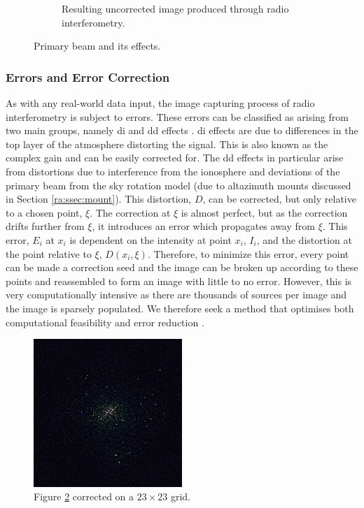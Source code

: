 \begin{figure}[H]
\begin{subfigure}{0.45\textwidth}
	\caption{Resulting uncorrected image produced through radio interferometry.}
	\label{ra:fig:uncorr}
  \end{subfigure}
  \caption{Primary beam and its effects.}
\end{figure}
%
\subsubsection{Errors and Error Correction}\label{ra:ssec:eec}
As with any real-world data input, the image capturing process of radio interferometry is subject to errors. These errors can be classified as arising from two main groups, namely \gls{di} and \gls{dd} effects \citep{smirnov2011revisiting}. \gls{di} effects are due to differences in the top layer of the atmosphere distorting the signal. This is also known as the complex gain and can be easily corrected for. The \gls{dd} effects in particular arise from distortions due to interference from the ionosphere and deviations of the primary beam from the sky rotation model (due to altazimuth mounts discussed in Section \ref{ra:ssec:mount}). This distortion, $D$, can be corrected, but only relative to a chosen point, $\xi$. The correction at $\xi$ is almost perfect, but as the correction drifts further from $\xi$, it introduces an error which propagates away from $\xi$. This error, $E_i$ at $x_i$ is dependent on the intensity at point $x_i$, $I_i$, and the distortion at the point relative to $\xi$, $D(x_i,\xi)$. Therefore, to minimize this error, every point can be made a correction seed and the image can be broken up according to these points and reassembled to form an image with little to no error. However, this is very computationally intensive as there are thousands of sources per image and the image is sparsely populated. We therefore seek a method that optimises both computational feasibility and error reduction \citep{smirnov2015radio}.
\begin{figure}[H]
	\centering
	\includegraphics[width=0.5\textwidth]{Images/corrected-23x23.png}
	\caption{Figure \ref{ra:fig:uncorr} corrected on a $23\times23$ grid.}
	\label{ra:fig:cor23}
\end{figure}
